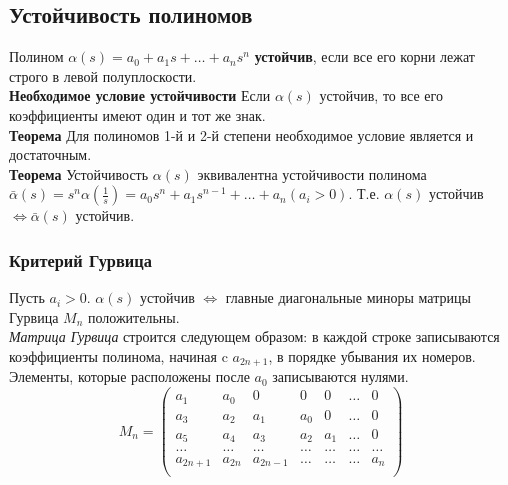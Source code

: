\documentclass[A4]{article}
\begin{document}
\subsection{Устойчивость полиномов}
Полином $\alpha(s)=a_0+a_1s+\ldots+a_ns^n$ \textbf{устойчив}, если все его корни лежат строго в левой полуплоскости.\\
\textbf{Необходимое условие устойчивости} Если $\alpha(s)$ устойчив, то все его коэффициенты имеют один и тот же знак.\\
\textbf{Теорема} Для полиномов 1-й и 2-й степени необходимое условие является и достаточным.\\
\textbf{Теорема} Устойчивость $\alpha(s)$ эквивалентна устойчивости полинома $\bar{\alpha}(s)=s^n\alpha\left(\frac{1}{s}\right)=a_0s^n+a_1s^{n-1}+\ldots+a_n(a_i>0)$. Т.е. $\alpha(s)$ устойчив $\Leftrightarrow\bar{\alpha}(s)$ устойчив.
\subsubsection{Критерий Гурвица}
Пусть $a_i>0$. $\alpha(s)$ устойчив $\Leftrightarrow$ главные диагональные миноры матрицы Гурвица $M_n$ положительны.\\
\emph{Матрица Гурвица} строится следующем образом: в каждой строке записываются коэффициенты полинома, начиная c $a_{2n+1}$, в порядке убывания их номеров. Элементы, которые расположены после $a_0$ записываются нулями.
\begin{equation} 
M_n=\left(\begin{array}{ccccccc}
a_1&a_0&0&0&0&\ldots&0\\
a_3&a_2&a_1&a_0&0&\ldots&0\\
a_5&a_4&a_3&a_2&a_1&\ldots&0\\
\ldots&\ldots&\ldots&\ldots&\ldots&\ldots&\ldots\\
a_{2n+1}&a_{2n}&a_{2n-1}&\ldots&\ldots&\ldots&a_n\\
\end{array}\right)
\end{equation}
\end{document}
